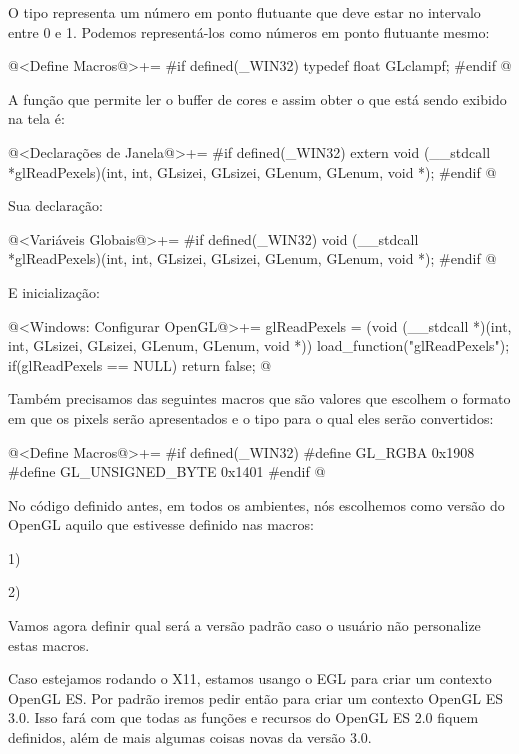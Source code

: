 O tipo  representa um número em ponto flutuante
que deve estar no intervalo entre 0 e 1. Podemos representá-los como
números em ponto flutuante mesmo:

\iniciocodigo
@<Define Macros@>+=
#if defined(_WIN32)
typedef float GLclampf;
#endif
@
\fimcodigo

A função que permite ler o buffer de cores e assim obter o que está
sendo exibido na tela é:

\iniciocodigo
@<Declarações de Janela@>+=
#if defined(_WIN32)
extern void (__stdcall *glReadPexels)(int, int, GLsizei, GLsizei, GLenum, GLenum,
                                      void *);
#endif
@
\fimcodigo

Sua declaração:

\iniciocodigo
@<Variáveis Globais@>+=
#if defined(_WIN32)
void (__stdcall *glReadPexels)(int, int, GLsizei, GLsizei, GLenum, GLenum,
                               void *);
#endif
@
\fimcodigo

E inicialização:

\iniciocodigo
@<Windows: Configurar OpenGL@>+=
glReadPexels = (void (__stdcall *)(int, int, GLsizei, GLsizei, GLenum, GLenum,
                               void *)) load_function("glReadPexels");
if(glReadPexels == NULL) return false;
@
\fimcodigo

Também precisamos das seguintes macros que são valores que escolhem o
formato em que os pixels serão apresentados e o tipo para o qual eles
serão convertidos:

\iniciocodigo
@<Define Macros@>+=
#if defined(_WIN32)
#define GL_RGBA          0x1908
#define GL_UNSIGNED_BYTE 0x1401
#endif
@
\fimcodigo


No código definido antes, em todos os ambientes, nós escolhemos como
versão do OpenGL aquilo que estivesse definido nas macros:

1) 

2) 

Vamos agora definir qual será a versão padrão caso o usuário não
personalize estas macros.

Caso estejamos rodando o X11, estamos usango o EGL para criar um
contexto OpenGL ES. Por padrão iremos pedir então para criar um
contexto OpenGL ES 3.0. Isso fará com que todas as funções e recursos
do OpenGL ES 2.0 fiquem definidos, além de mais algumas coisas novas
da versão 3.0.

